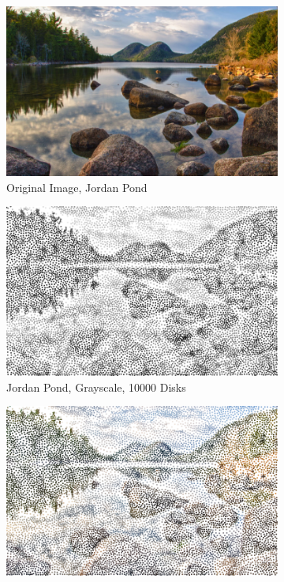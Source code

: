 \documentclass[11pt]{article}
\begin{document}
\begin{figure}[H]
	\centering
	\begin{subfigure}[b]{.52\linewidth}
		\includegraphics[width=\linewidth]{Jordan-Pond}
		\caption{Original Image, Jordan Pond}
		\label{fig:jordanPond}
	\end{subfigure}
	\begin{subfigure}[b]{.48\linewidth}
		\includegraphics[width=\linewidth]{Jordan-Pond-Grayscale-10000}
		\caption{Jordan Pond, Grayscale, 10000 Disks}
		\label{fig:jordanPondGray}
	\end{subfigure}
	\begin{subfigure}[b]{.48\linewidth}
		\includegraphics[width=\linewidth]{Jordan-Pond-Color-10000}

\end{subfigure}
\end{figure}
\end{document}
